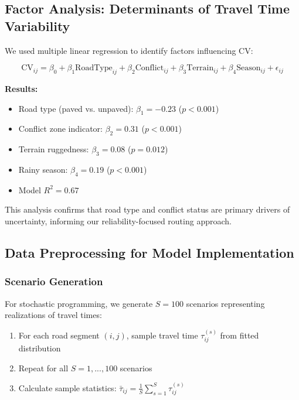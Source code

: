 \subsection{Factor Analysis: Determinants of Travel Time Variability}

We used multiple linear regression to identify factors influencing CV:

\begin{equation}
\text{CV}_{ij} = \beta_0 + \beta_1 \text{RoadType}_{ij} + \beta_2 \text{Conflict}_{ij} + \beta_3 \text{Terrain}_{ij} + \beta_4 \text{Season}_{ij} + \epsilon_{ij}
\end{equation}

\textbf{Results:}
\begin{itemize}
\item Road type (paved vs. unpaved): $\beta_1 = -0.23$ ($p < 0.001$)
\item Conflict zone indicator: $\beta_2 = 0.31$ ($p < 0.001$)
\item Terrain ruggedness: $\beta_3 = 0.08$ ($p = 0.012$)
\item Rainy season: $\beta_4 = 0.19$ ($p < 0.001$)
\item Model $R^2 = 0.67$
\end{itemize}

This analysis confirms that road type and conflict status are primary drivers of uncertainty, informing our reliability-focused routing approach.

\subsection{Data Preprocessing for Model Implementation}

\subsubsection{Scenario Generation}

For stochastic programming, we generate $S = 100$ scenarios representing realizations of travel times:
\begin{enumerate}
\item For each road segment $(i,j)$, sample travel time $\tau_{ij}^{(s)}$ from fitted distribution
\item Repeat for all $S = 1, ..., 100$ scenarios
\item Calculate sample statistics: $\bar{\tau}_{ij} = \frac{1}{S}\sum_{s=1}^S \tau_{ij}^{(s)}$
\end{enumerate}

